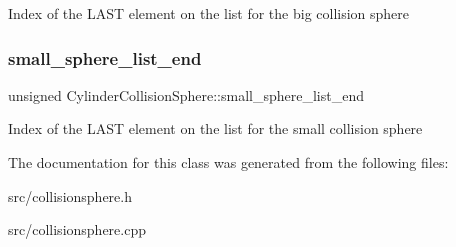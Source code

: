 Index of the L\+A\+ST element on the list for the big collision sphere \mbox{\label{class_cylinder_collision_sphere_a89e3bdfa12042aa94c20949587c513d5}} 
\subsubsection{\texorpdfstring{small\+\_\+sphere\+\_\+list\+\_\+end}{small\_sphere\_list\_end}}
{\footnotesize\ttfamily unsigned Cylinder\+Collision\+Sphere\+::small\+\_\+sphere\+\_\+list\+\_\+end}

Index of the L\+A\+ST element on the list for the small collision sphere 

The documentation for this class was generated from the following files\+:\begin{DoxyCompactItemize}
\item 
src/collisionsphere.\+h\item 
src/collisionsphere.\+cpp\end{DoxyCompactItemize}
